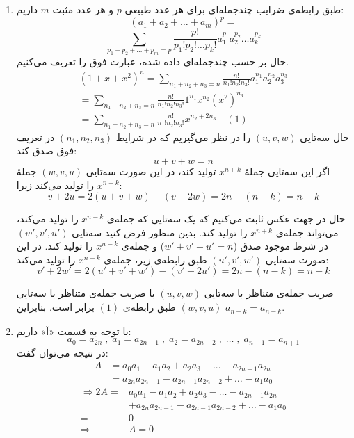 	\begin{enumerate}
		\item 
        \p
        طبق رابطه‌ی ضرایب چندجمله‌ای برای هر عدد
         طبیعی 
         $p$
         و هر عدد مثبت 
         $m$ 
          داریم:
        $$(a_1+a_2+\ldots+a_m)^p = $$
        $$\sum_{p_1+p_2+\ldots+p_m=p} \frac{p!}{p_1!p_2!\ldots p_k!} a_1^{p_1}a_2^{p_2}\ldots a_k^{p_k}$$
        حال بر حسب چندجمله‌ای داده ‌شده، عبارت فوق را تعریف می‌کنیم.
        \begin{align*}
		(1+x+x^2)^n = \sum_{n_1+n_2+n_3=n} \frac{n!}{n_1!n_2!n_3!} a_1^{n_1} a_2^{n_2} a_3^{n_3}\\
		= \sum_{n_1+n_2+n_3=n} \frac{n!}{n_1!n_2!n_3!} 1^{n_1} x^{n_2} (x^2)^{n_3}\\
		= \sum_{n_1+n_2+n_3=n} \frac{n!}{n_1!n_2!n_3!} x^{n_2 + 2n_3}  \quad (1)
        \end{align*}
		حال سه‌تایی
         $(u , v , w)$
         را در نظر می‌گیریم که در شرایط 
         $(n_1 , n_2 , n_3)$
       در تعریف فوق صدق کند:
       $$u + v + w = n$$
        اگر این سه‌تایی  جملهٔ $x^{n + k}$ تولید کند، در این صورت سه‌تایی $(w , v , u)$ جملهٔ $x^{n - k}$ را تولید می‌کند زیرا:
        $$v + 2u = 2(u + v + w) - (v + 2w) = 2n - (n + k) = n -k$$
        
        \p
        حال در جهت عکس ثابت می‌کنیم که یک سه‌تایی که جمله‌ی
        $x^{n-k}$
        را تولید می‌کند، می‌تواند جمله‌ی
        $x^{n+k}$
        را تولید کند. بدین منظور فرض کنید سه‌تایی
        $(w', v', u')$
        در شرط موجود صدق 
        ($w' + v' + u'=n$)
        و جمله‌ی
        $x^{n-k}$
        را تولید کند.
        در این صورت سه‌تایی
        $(u',v',w')$
        طبق رابطه‌ی زیر، جمله‌ی 
        $x^{n+k}$
        را تولید می‌کند:
    	$$v' + 2w' = 2(u' + v' + w') - (v' + 2u') = 2n - (n - k) = n +k$$
	
        \p
    	 ضریب جمله‌ی متناظر با سه‌تایی 
        $(u , v , w)$ 
        با ضریب جمله‌ی متناظر با سه‌تایی 
        $(w , v , u)$
         طبق رابطه‌ی $(1)$ برابر است. بنابراین 
         $a_{n + k} = a_{n - k}$.
	
	\item
        \p
          با توجه به قسمت  
          «آ»
          داریم:
    	$$a_0 = a_{2n} \; ,\; a_1 = a_{2n - 1}\; ,\; a_2 = a_{2n - 2}\; ,\; \dots \; ,\; a_{n - 1} = a_{n + 1}$$
        در نتیجه می‌توان گفت:
        \begin{align*}
            A &= a_0a_1 - a_1a_2 + a_2a_3 - ... - a_{2n-1}a_{2n} \\
            &= a_{2n}a_{2n-1} - a_{2n-1}a_{2n-2} +\dots - a_1a_0 
        \end{align*}
    	\begin{align*}
    		\Rightarrow 2A = &a_0a_1 - a_1a_2 + a_2a_3 - \dots - a_{2n-1}a_{2n}\\
    		&+ a_{2n}a_{2n-1} - a_{2n-1}a_{2n-2} +\dots - a_1a_0 \\
            = &0\\
    		\Rightarrow &A = 0
    	\end{align*}
	

\end{enumerate}
